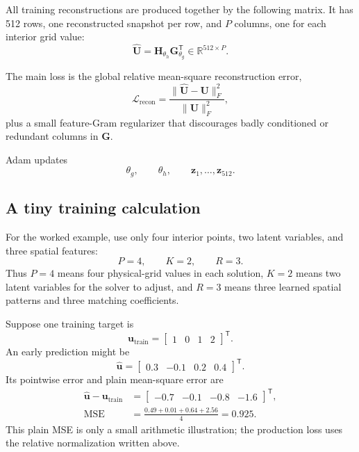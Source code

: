 \documentclass[11pt]{article}
\newcommand{\mat}[1]{\mathbf{#1}}
\newcommand{\vect}[1]{\mathbf{#1}}
\newcommand{\R}{\mathbb{R}}
\begin{document}
All training reconstructions are produced together by the following matrix.
It has 512 rows, one reconstructed snapshot per row, and $P$ columns, one for
each interior grid value:
\begin{equation}
  \widehat{\mat{U}}=\mat{H}_{\theta_h}\mat{G}_{\theta_g}^{\mathsf T}
  \in\R^{512\times P}.
\end{equation}

The main loss is the global relative mean-square reconstruction error,
\begin{equation}
  \mathcal{L}_{\mathrm{recon}}
  =
  \frac{\lVert\widehat{\mat{U}}-\mat{U}\rVert_F^2}
       {\lVert\mat{U}\rVert_F^2},
\end{equation}
plus a small feature-Gram regularizer that discourages badly conditioned or
redundant columns in $\mat{G}$.

Adam updates
\begin{equation}
  \theta_g,\qquad \theta_h,\qquad
  \vect{z}_1,\ldots,\vect{z}_{512}.
\end{equation}

\subsection{A tiny training calculation}

For the worked example, use only four interior points, two latent variables,
and three spatial features:
\begin{equation}
  P=4,\qquad K=2,\qquad R=3.
\end{equation}
Thus $P=4$ means four physical-grid values in each solution, $K=2$ means two
latent variables for the solver to adjust, and $R=3$ means three learned
spatial patterns and three matching coefficients.

Suppose one training target is
\begin{equation}
  \vect{u}_{\mathrm{train}}
  =\begin{bmatrix}1&0&1&2\end{bmatrix}^{\mathsf T}.
\end{equation}
An early prediction might be
\begin{equation}
  \widehat{\vect{u}}
  =\begin{bmatrix}0.3&-0.1&0.2&0.4\end{bmatrix}^{\mathsf T}.
\end{equation}
Its pointwise error and plain mean-square error are
\begin{align}
  \widehat{\vect{u}}-\vect{u}_{\mathrm{train}}
    &=\begin{bmatrix}-0.7&-0.1&-0.8&-1.6\end{bmatrix}^{\mathsf T},\\
  \mathrm{MSE}
    &=\frac{0.49+0.01+0.64+2.56}{4}=0.925.
\end{align}
This plain MSE is only a small arithmetic illustration; the production loss
uses the relative normalization written above.
\end{document}
